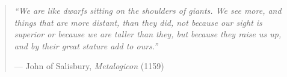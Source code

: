 

\begin{quotation}
    \textit{
        ``We are like dwarfs sitting on the shoulders of giants.
        We see more, and things that are more distant, than they did, not because our sight is superior or because we are taller than they, but because they raise us up, and by their great stature add to ours.''
    }
    \begin{flushright}
        --- John of Salisbury, \emph{Metalogicon} (1159)
    \end{flushright}
\end{quotation}
